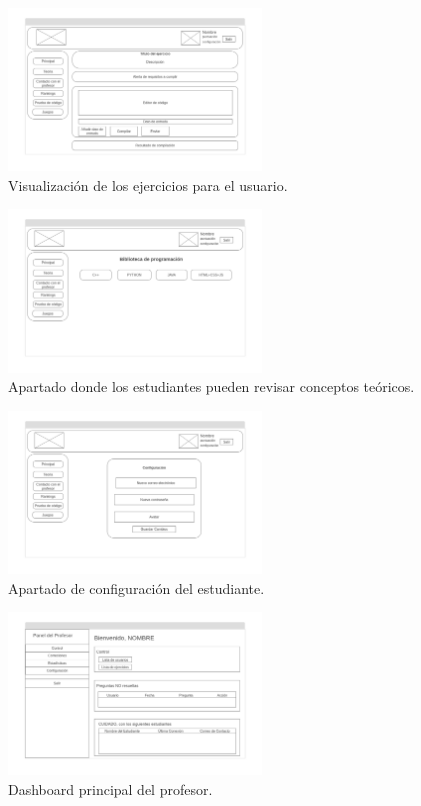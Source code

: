 \begin{figure}[H]
    \centering
    \includegraphics[width=0.6\textwidth]{imagenes/Mockups/8-Ejercicio.png}
    \caption{Visualización de los ejercicios para el usuario.}
\end{figure}

\begin{figure}[H]
    \centering
    \includegraphics[width=0.6\textwidth]{imagenes/Mockups/9-Consulta-Teoria.png}
    \caption{Apartado donde los estudiantes pueden revisar conceptos teóricos.}
\end{figure}

\begin{figure}[H]
    \centering
    \includegraphics[width=0.6\textwidth]{imagenes/Mockups/10-Configuracion-Est-.png}
    \caption{Apartado de configuración del estudiante.}
\end{figure}

\begin{figure}[H]
    \centering
    \includegraphics[width=0.6\textwidth]{imagenes/Mockups/11-Profesor-Principal.png}
    \caption{Dashboard principal del profesor.}
\end{figure}

